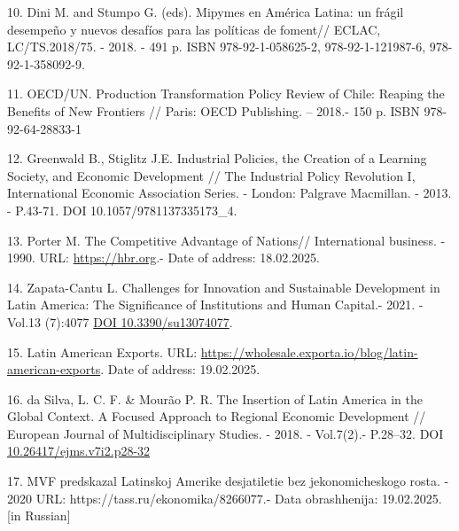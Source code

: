 \begin{references}
10. Dini M. and Stumpo G. (eds). Mipymes en América Latina: un frágil
desempeño y nuevos desafíos para las políticas de foment// ECLAC,
LC/TS.2018/75. - 2018. - 491 p. ISBN 978-92-1-058625-2,
978-92-1-121987-6, 978-92-1-358092-9.

11. OECD/UN. Production Transformation Policy Review of Chile: Reaping
the Benefits of New Frontiers // Paris: OECD Publishing. -- 2018.- 150
p. ISBN 978-92-64-28833-1

12. Greenwald B., Stiglitz J.E. Industrial Policies, the Creation of a
Learning Society, and Economic Development // The Industrial Policy
Revolution I, International Economic Association Series. - London:
Palgrave Macmillan. - 2013. - P.43-71. DOI 10.1057/9781137335173\_4.

13. Porter M. The Competitive Advantage of Nations// International
business. - 1990. URL:
\href{https://hbr.org/1990/03/the-competitive-advantage-of-nations}{https://hbr.org}.-
Date of address: 18.02.2025.

14. Zapata-Cantu L. Challenges for Innovation and Sustainable Development
in Latin America: The Significance of Institutions and Human Capital.-
2021. -Vol.13 (7):4077
\href{https://doi.org/10.3390/su13074077}{DOI 10.3390/su13074077}.

15. Latin American Exports. URL:
\url{https://wholesale.exporta.io/blog/latin-american-exports}. Date of
address: 19.02.2025.

16. da Silva, L. C. F. \& Mourão P. R. The Insertion of Latin America in
the Global Context. A Focused Approach to Regional Economic Development
// European Journal of Multidisciplinary Studies. - 2018. - Vol.7(2).-
P.28--32. DOI
\href{http://dx.doi.org/10.26417/ejms.v7i2.p28-32}{10.26417/ejms.v7i2.p28-32}

17. MVF predskazal Latinskoj Amerike desjatiletie bez jekonomicheskogo
rosta. - 2020 URL: https://tass.ru/ekonomika/8266077.- Data
obrashhenija: 19.02.2025. {[}in Russian{]}
\end{references}

